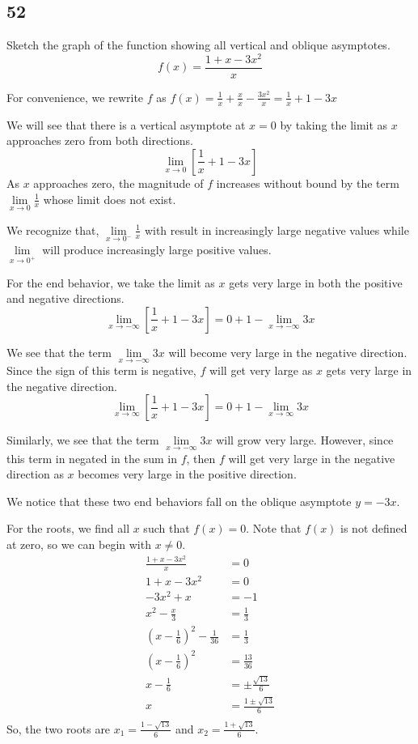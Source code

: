 \documentclass[../hw4.tex]{subfiles}
\begin{document}
\subsection*{52}
Sketch the graph of the function showing all
vertical and oblique asymptotes.
\[f(x) = \frac{1+x-3x^2}{x}\]

For convenience, we rewrite $f$ as $f(x)=\frac{1}{x} + \frac{x}{x} - \frac{3x^2}{x} = \frac{1}{x} + 1 - 3x$

We will see that there is a vertical asymptote at $x=0$ by taking the limit as $x$ approaches zero from both directions.
\[\lim\limits_{x\to0} \left[ \frac{1}{x} + 1 - 3x \right]\]
As $x$ approaches zero, the magnitude of $f$ increases without bound by the term $\lim\limits_{x\to0} \frac{1}{x}$ whose limit does not exist.

We recognize that, $\lim\limits_{x\to0^-} \frac{1}{x}$ with result in increasingly large negative values while $\lim\limits_{x\to0^+}$ will produce increasingly large positive values.

For the end behavior, we take the limit as $x$ gets very large in both the positive and negative directions.
\[\lim\limits_{x\to-\infty} \left[ \frac{1}{x} + 1 - 3x \right] = 0 + 1 - \lim\limits_{x\to-\infty} 3x\]

We see that the term $\lim\limits_{x\to-\infty} 3x$ will become very large in the negative direction. Since the sign of this term is negative, $f$ will get very large as $x$ gets very large in the negative direction.
\[\lim\limits_{x\to\infty} \left[ \frac{1}{x} + 1 - 3x \right] = 0 + 1 - \lim\limits_{x\to\infty} 3x\]

Similarly, we see that the term $\lim\limits_{x\to-\infty} 3x$ will grow very large. However, since this term in negated in the sum in $f$, then $f$ will get very large in the negative direction as $x$ becomes very large in the positive direction.

We notice that these two end behaviors fall on the oblique asymptote $y=-3x$.

For the roots, we find all $x$ such that $f(x)=0$. Note that $f(x)$ is not defined at zero, so we can begin with $x\neq0$.
\begin{align*}
    \frac{1+x-3x^2}{x} &= 0 \\
    1+x-3x^2 &= 0 \\
    -3x^2+x &= -1 \\
    x^2 -\frac{x}{3} &= \frac{1}{3} \\
    {\left( x-\frac{1}{6} \right)}^2 - \frac{1}{36} &= \frac{1}{3} \\
    {\left( x-\frac{1}{6} \right)}^2 &= \frac{13}{36} \\
    x-\frac{1}{6} &= \pm \frac{\sqrt{13}}{6} \\
    x &= \frac{1 \pm \sqrt{13}}{6} \\
\end{align*}
So, the two roots are $x_1 = \frac{1-\sqrt{13}}{6}$ and $x_2 = \frac{1+\sqrt{13}}{6}$.
\end{document}
